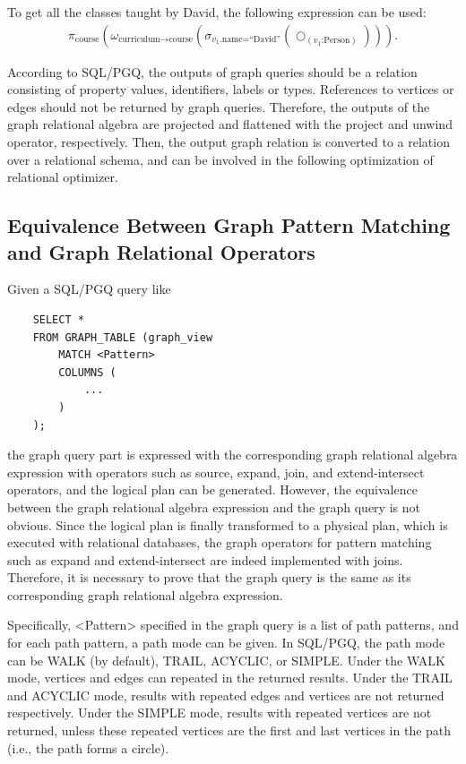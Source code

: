 \begin{example}
    To get all the classes taught by David, the following expression can be used:
    \begin{equation*}
        \begin{split}
            \pi_{\text{course}}(\omega_{\text{curriculum} \rightarrow \text{course}}(\sigma_{v_1\text{.name=``David''}}(\bigcirc_{(v_1\text{:Person})}))).
        \end{split}
    \end{equation*}
\end{example}


According to SQL/PGQ, the outputs of graph queries should be a relation consisting of property values, identifiers, labels or types.
References to vertices or edges should not be returned by graph queries.
Therefore, the outputs of the graph relational algebra are projected and flattened with the project and unwind operator, respectively.
Then, the output graph relation is converted to a relation over a relational schema, and can be involved in the following optimization of relational optimizer.

\subsection{Equivalence Between Graph Pattern Matching and Graph Relational Operators}

Given a SQL/PGQ query like 
\begin{lstlisting}
    SELECT * 
    FROM GRAPH_TABLE (graph_view
        MATCH <Pattern>
        COLUMNS (
            ...
        )
    );
\end{lstlisting}
the graph query part is expressed with the corresponding graph relational algebra expression with operators such as source, expand, join, and extend-intersect operators, and the logical plan can be generated.
However, the equivalence between the graph relational algebra expression and the graph query is not obvious.
Since the logical plan is finally transformed to a physical plan, which is executed with relational databases, the graph operators for pattern matching such as expand and extend-intersect are indeed implemented with joins.
Therefore, it is necessary to prove that the graph query is the same as its corresponding graph relational algebra expression.

Specifically, <Pattern> specified in the graph query is a list of path patterns, and for each path pattern, a path mode can be given.
In SQL/PGQ, the path mode can be WALK (by default), TRAIL, ACYCLIC, or SIMPLE.
Under the WALK mode, vertices and edges can repeated in the returned results.
Under the TRAIL and ACYCLIC mode, results with repeated edges and vertices are not returned respectively.
Under the SIMPLE mode, results with repeated vertices are not returned, unless these repeated vertices are the first and last vertices in the path (i.e., the path forms a circle).

